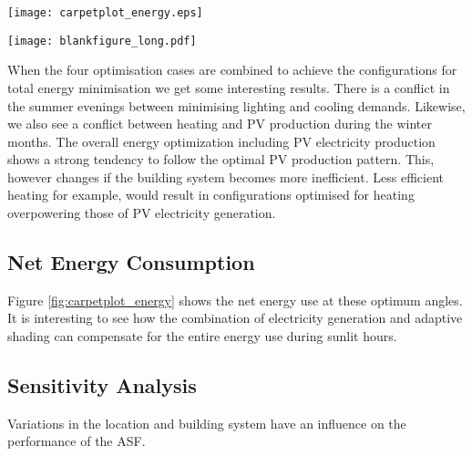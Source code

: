 \begin{figure*}
\begin{center}
\texttt{[image: carpetplot\_energy.eps]}
\caption{Carpet plots detailing the net energy consumption. Each square represents the total energy consumption for that specific hour of the entire month. Red colours detail the energy demand, while blue colours detail the energy supply.}
\label{fig:carpetplot_energy}
\end{center}
\end{figure*}

\begin{figure*}
\begin{center}
\texttt{[image: blankfigure\_long.pdf]}
\caption{Variation in energy production between optimal energy solar solar tracking, and optimal electricity harvest}
\label{fig:solardiff}
\end{center}
\end{figure*}

When the four optimisation cases are combined to achieve the configurations for total energy minimisation we get some interesting results. There is a conflict in the summer evenings between minimising lighting and cooling demands. Likewise, we also see a conflict between heating and PV production during the winter months. The overall energy optimization including PV electricity production shows a strong tendency to follow the optimal PV production pattern. This, however changes if the building system becomes more inefficient. Less efficient heating for example, would result in configurations optimised for heating overpowering those of PV electricity generation.

\subsection{Net Energy Consumption}

Figure \ref{fig:carpetplot_energy} shows the net energy use at these optimum angles. It is interesting to see how the combination of electricity generation and adaptive shading can compensate for the entire energy use during sunlit hours.


\subsection{Sensitivity Analysis}

Variations in the location and building system have an influence on the performance of the ASF. 

